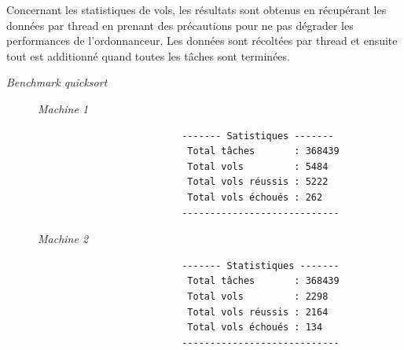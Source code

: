 \documentclass[a4paper]{article}
\def\mone{\textit{Machine 1}} %
\def\mtwo{\textit{Machine 2}} %
\def\bone{\textit{Benchmark quicksort}}
\begin{document}
Concernant les statistiques de vols, les résultats sont obtenus en récupérant
les données par thread en prenant des précautions pour ne pas dégrader les
performances de l'ordonnanceur. Les données sont récoltées par thread et ensuite
tout est additionné quand toutes les tâches sont terminées.

\begin{description}
  \item[\bone] \hspace{1em}
        \begin{description}
          \item[\mone] \hspace{1em}
                \begin{samepage}
                  \begin{verbatim}
                    ------- Satistiques -------
                     Total tâches       : 368439
                     Total vols         : 5484
                     Total vols réussis : 5222
                     Total vols échoués : 262
                    ----------------------------
                  \end{verbatim}
                \end{samepage}
          \item[\mtwo] \hspace{1em}
                \begin{samepage}
                  \begin{verbatim}
                    ------- Statistiques -------
                     Total tâches       : 368439
                     Total vols         : 2298
                     Total vols réussis : 2164
                     Total vols échoués : 134
                    ----------------------------
                  \end{verbatim}
                \end{samepage}
        \end{description}


\end{description}
\end{document}
